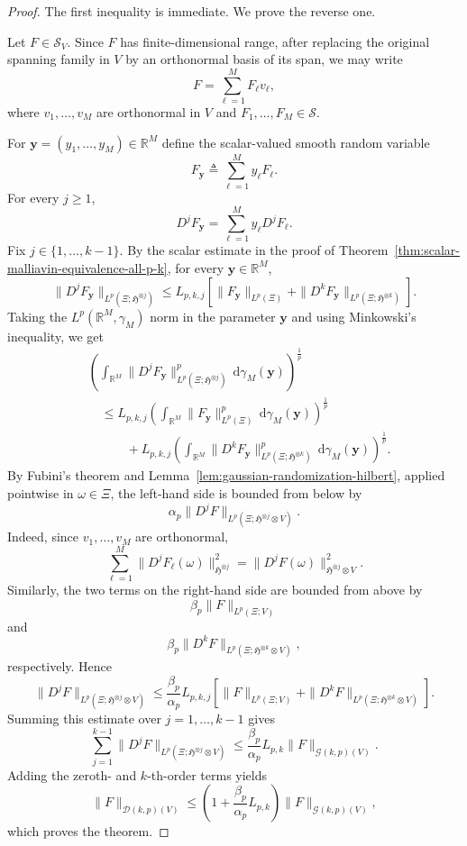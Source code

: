 \documentclass[10pt,a4paper]{amsart}
\begin{document}
\begin{proof}
	The first inequality is immediate.  We prove the reverse one.
	
	Let $F\in\mathcal{S}_{V}$.  Since $F$ has finite-dimensional range, after replacing the original spanning family in $V$ by an orthonormal basis of its span, we may write
	$$
	F=\sum_{\ell=1}^{M}F_{\ell}v_{\ell},
	$$
	where $v_{1},\ldots,v_{M}$ are orthonormal in $V$ and $F_{1},\ldots,F_{M}\in\mathcal{S}$.
	
	For $\textbf{y}=(y_{1},\ldots,y_{M})\in\mathbb{R}^{M}$ define the scalar-valued smooth random variable
	$$
	F_{\textbf{y}}
	\triangleq
	\sum_{\ell=1}^{M}y_{\ell}F_{\ell}.
	$$
	For every $j\geqslant1$,
	$$
	D^{j}F_{\textbf{y}}
	=
	\sum_{\ell=1}^{M}y_{\ell}D^{j}F_{\ell}.
	$$
	Fix $j\in\{1,\ldots,k-1\}$.  By the scalar estimate in the proof of Theorem~\ref{thm:scalar-malliavin-equivalence-all-p-k}, for every $\textbf{y}\in\mathbb{R}^{M}$,
	$$
	\|D^{j}F_{\textbf{y}}\|_{L^{p}(\Xi;\mathfrak{H}^{\otimes j})}
	\leqslant
	L_{p,k,j}
	\left[
	\|F_{\textbf{y}}\|_{L^{p}(\Xi)}
	+
	\|D^{k}F_{\textbf{y}}\|_{L^{p}(\Xi;\mathfrak{H}^{\otimes k})}
	\right].
	$$
	Taking the $L^{p}(\mathbb{R}^{M},\gamma_{M})$ norm in the parameter $\textbf{y}$ and using Minkowski's inequality, we get
	$$
	\begin{aligned}
		&\left(
		\int_{\mathbb{R}^{M}}
		\|D^{j}F_{\textbf{y}}\|_{L^{p}(\Xi;\mathfrak{H}^{\otimes j})}^{p}
		\,\mathrm{d}\gamma_{M}(\textbf{y})
		\right)^{\frac1p}
		\\
		&\quad\leqslant
		L_{p,k,j}
		\left(
		\int_{\mathbb{R}^{M}}
		\|F_{\textbf{y}}\|_{L^{p}(\Xi)}^{p}
		\,\mathrm{d}\gamma_{M}(\textbf{y})
		\right)^{\frac1p}
		\\
		&\qquad\quad+
		L_{p,k,j}
		\left(
		\int_{\mathbb{R}^{M}}
		\|D^{k}F_{\textbf{y}}\|_{L^{p}(\Xi;\mathfrak{H}^{\otimes k})}^{p}
		\,\mathrm{d}\gamma_{M}(\textbf{y})
		\right)^{\frac1p}.
	\end{aligned}
	$$
	By Fubini's theorem and Lemma~\ref{lem:gaussian-randomization-hilbert}, applied pointwise in $\omega\in\Xi$, the left-hand side is bounded from below by
	$$
	\alpha_{p}
	\|D^{j}F\|_{L^{p}(\Xi;\mathfrak{H}^{\otimes j}\otimes V)}.
	$$
	Indeed, since $v_{1},\ldots,v_{M}$ are orthonormal,
	$$
	\sum_{\ell=1}^{M}
	\|D^{j}F_{\ell}(\omega)\|_{\mathfrak{H}^{\otimes j}}^{2}
	=
	\|D^{j}F(\omega)\|_{\mathfrak{H}^{\otimes j}\otimes V}^{2}.
	$$
	Similarly, the two terms on the right-hand side are bounded from above by
	$$
	\beta_{p}\|F\|_{L^{p}(\Xi;V)}
	$$
	and
	$$
	\beta_{p}
	\|D^{k}F\|_{L^{p}(\Xi;\mathfrak{H}^{\otimes k}\otimes V)},
	$$
	respectively.  Hence
	$$
	\|D^{j}F\|_{L^{p}(\Xi;\mathfrak{H}^{\otimes j}\otimes V)}
	\leqslant
	\frac{\beta_{p}}{\alpha_{p}}L_{p,k,j}
	\left[
	\|F\|_{L^{p}(\Xi;V)}
	+
	\|D^{k}F\|_{L^{p}(\Xi;\mathfrak{H}^{\otimes k}\otimes V)}
	\right].
	$$
	Summing this estimate over $j=1,\ldots,k-1$ gives
	$$
	\sum_{j=1}^{k-1}
	\|D^{j}F\|_{L^{p}(\Xi;\mathfrak{H}^{\otimes j}\otimes V)}
	\leqslant
	\frac{\beta_{p}}{\alpha_{p}}L_{p,k}
	\|F\|_{\mathcal{G}(k,p)(V)}.
	$$
	Adding the zeroth- and $k$-th-order terms yields
	$$
	\|F\|_{\mathcal{D}(k,p)(V)}
	\leqslant
	\left(1+\frac{\beta_{p}}{\alpha_{p}}L_{p,k}\right)
	\|F\|_{\mathcal{G}(k,p)(V)},
	$$
	which proves the theorem.
\end{proof}
\end{document}
